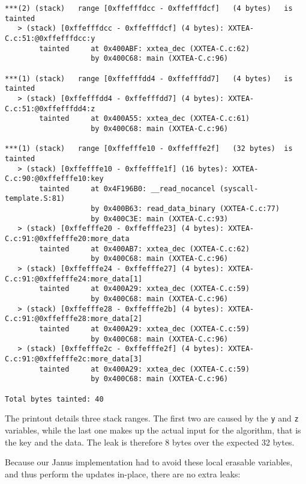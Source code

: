 \documentclass[a4paper,10pt,openright]{memoir}
\newcommand{\code}[1]{\texttt{#1}}
\begin{document}
\begin{verbatim}
***(2) (stack)	 range [0xffefffdcc - 0xffefffdcf]	 (4 bytes)	 is tainted
   > (stack) [0xffefffdcc - 0xffefffdcf] (4 bytes): XXTEA-C.c:51:@0xffefffdcc:y
        tainted     at 0x400ABF: xxtea_dec (XXTEA-C.c:62)
                    by 0x400C68: main (XXTEA-C.c:96)

***(1) (stack)	 range [0xffefffdd4 - 0xffefffdd7]	 (4 bytes)	 is tainted
   > (stack) [0xffefffdd4 - 0xffefffdd7] (4 bytes): XXTEA-C.c:51:@0xffefffdd4:z
        tainted     at 0x400A55: xxtea_dec (XXTEA-C.c:61)
                    by 0x400C68: main (XXTEA-C.c:96)

***(1) (stack)	 range [0xffefffe10 - 0xffefffe2f]	 (32 bytes)	 is tainted
   > (stack) [0xffefffe10 - 0xffefffe1f] (16 bytes): XXTEA-C.c:90:@0xffefffe10:key
        tainted     at 0x4F196B0: __read_nocancel (syscall-template.S:81)
                    by 0x400B63: read_data_binary (XXTEA-C.c:77)
                    by 0x400C3E: main (XXTEA-C.c:93)
   > (stack) [0xffefffe20 - 0xffefffe23] (4 bytes): XXTEA-C.c:91:@0xffefffe20:more_data
        tainted     at 0x400AB7: xxtea_dec (XXTEA-C.c:62)
                    by 0x400C68: main (XXTEA-C.c:96)
   > (stack) [0xffefffe24 - 0xffefffe27] (4 bytes): XXTEA-C.c:91:@0xffefffe24:more_data[1]
        tainted     at 0x400A29: xxtea_dec (XXTEA-C.c:59)
                    by 0x400C68: main (XXTEA-C.c:96)
   > (stack) [0xffefffe28 - 0xffefffe2b] (4 bytes): XXTEA-C.c:91:@0xffefffe28:more_data[2]
        tainted     at 0x400A29: xxtea_dec (XXTEA-C.c:59)
                    by 0x400C68: main (XXTEA-C.c:96)
   > (stack) [0xffefffe2c - 0xffefffe2f] (4 bytes): XXTEA-C.c:91:@0xffefffe2c:more_data[3]
        tainted     at 0x400A29: xxtea_dec (XXTEA-C.c:59)
                    by 0x400C68: main (XXTEA-C.c:96)

Total bytes tainted: 40
\end{verbatim}

The printout details three stack ranges. The first two are caused by 
the \code{y} and \code{z} variables, while the last one makes up the 
actual input for the algorithm, that is the key and the data. The leak 
is therefore 8 bytes over the expected 32 bytes.

Because our Janus implementation had to avoid these local erasable 
variables, and thus perform the updates in-place, there are no extra 
leaks:
\end{document}
